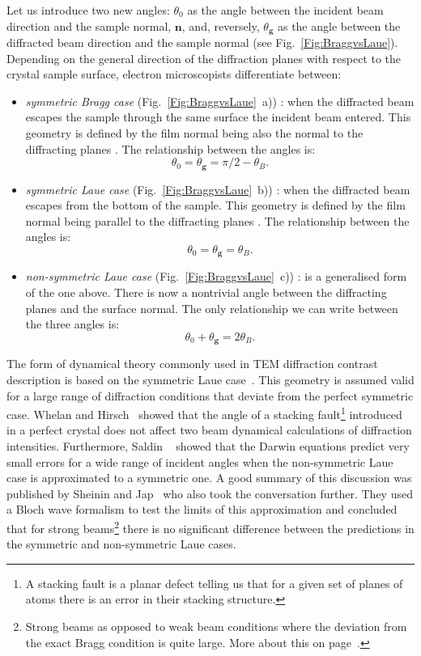 Let us introduce two new angles: $\theta_0$ as the angle between the incident beam direction and the sample normal, $\mathbf{n}$,  and, reversely, $\theta_\mathbf{g}$ as the angle between the diffracted beam direction and the sample normal (see Fig.~\ref{Fig:BraggvsLaue}). 
Depending on the general direction of the diffraction planes with respect to the crystal sample surface, electron microscopists differentiate between:
\begin{itemize}
    \item \emph{symmetric Bragg case} (Fig.~\ref{Fig:BraggvsLaue}~a)) :  when the diffracted beam escapes the sample through the same surface the incident beam entered. This geometry is defined by the film normal being also the normal to the diffracting planes . The relationship between the angles is:
    \begin{equation*}
        \theta_0 =   \theta_\mathbf{g} =\pi/2 -\theta_B.
    \end{equation*}
     \item \emph{symmetric Laue case} (Fig.~\ref{Fig:BraggvsLaue}~b)) : when the diffracted beam escapes from the  bottom of the sample. This geometry is defined by the film normal being parallel to the  diffracting planes .  The relationship between the angles is:
      \[ \theta_0 =   \theta_\mathbf{g} = \theta_B.\]
    \item  \emph{non-symmetric Laue case} (Fig.~\ref{Fig:BraggvsLaue}~c)) : is a generalised form of the one above. There is now  a nontrivial angle between the diffracting planes and the surface normal. The only relationship we can write between the three angles is:
    \[ \theta_0 +  \theta_\mathbf{g} = 2 \theta_B.\]
\end{itemize}
\vspace{-0.5cm}

 The form of dynamical theory commonly used in TEM diffraction contrast description is based on the symmetric Laue case~\cite{Howie61}. This geometry is assumed valid for a large range of diffraction conditions that deviate from the perfect symmetric case.  Whelan and Hirsch~\cite{Whelan57} showed that the angle of a stacking fault\footnote{A stacking fault is a planar defect telling us that for a given set of planes of atoms there is an error in their stacking structure. } introduced in a perfect crystal does not affect two beam dynamical calculations of diffraction intensities. Furthermore, Saldin \etal~\cite{Saldin78} showed that the Darwin equations predict very small errors for a wide range of incident angles when the non-symmetric Laue case is approximated to a symmetric one. A good summary of this discussion was published by Sheinin and Jap~\cite{Sheinin79} who also took the conversation further. They used a Bloch wave formalism to test the limits of this approximation and concluded that for strong beams\footnote{ Strong beams as opposed to weak beam conditions where the deviation from the exact Bragg condition is quite large. More about this on page~\pageref{sec:sg}.} there is no significant difference between the predictions in the symmetric and non-symmetric Laue cases.




